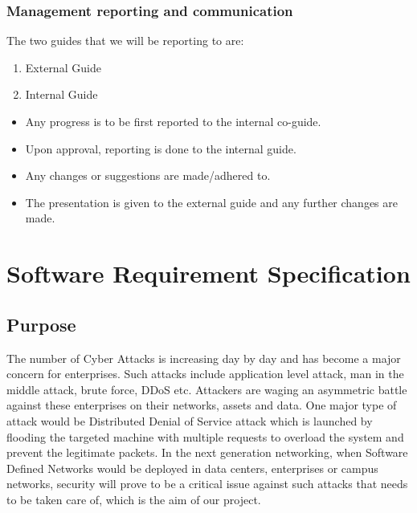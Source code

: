\documentclass[12pt,a4paper,final]{report}
\begin{document}
\subsection{Management reporting and communication}

The two guides that we will be reporting to are:

\begin{enumerate}
\item
External Guide
\item
Internal Guide
\end{enumerate}

\begin{itemize}
\item
Any progress is to be first reported to the internal co-guide.
\item
Upon approval, reporting is done to the internal guide.
\item 
Any changes or suggestions are made/adhered to.
\item
The presentation is given to the external guide and any further changes are
made.
\end{itemize}


\newpage




\chapter{Software Requirement Specification}
\thispagestyle{empty}
\newpage
\section{Purpose}
The number of Cyber Attacks is increasing day by day and has become a major concern for enterprises. Such attacks include application level attack, man in the middle attack, brute force, DDoS etc. Attackers are waging an asymmetric battle against these enterprises on their networks, assets and data. One major type of attack would be Distributed Denial of Service attack which is launched by flooding the targeted machine with multiple requests to overload the system and prevent the legitimate packets. In the next generation networking, when Software Defined Networks would be deployed in data centers, enterprises or campus networks, security will prove to be a critical issue against such attacks that needs to be taken care of, which is the aim of our project.
\end{document}
